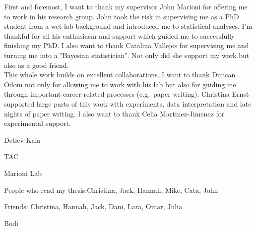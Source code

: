 
\begin{acknowledgements}      


First and foremost, I want to thank my supervisor John Marioni for offering me to work in his research group. John took the risk in supervising me as a PhD student from a wet-lab background and introduced me to statistical analyses. I'm thankful for all his enthusiasm and support which guided me to successfully finishing my PhD. I also want to thank Catalina Vallejos for supervising me and turning me into a "Bayesian statistician". Not only did she support my work but also as a good friend. \\

This whole work builds on excellent collaborations. I want to thank Duncan Odom not only for allowing me to work with his lab but also for guiding me through important career-related processes (e.g.~paper writing). Christina Ernst supported large parts of this work with experiments, data interpretation and late nights of paper writing. I also want to thank Celia Martinez-Jimenez for experimental support.  

Detlev Kaia

TAC

Marioni Lab

People who read my thesis:Christina, Jack, Hannah, Mike, Cata, John

Friends: Christina, Hannah, Jack, Dani, Lara, Omar, Julia

Bodi

\end{acknowledgements}
